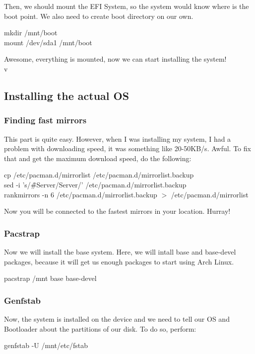 \documentclass{article}
\begin{document}
Then, we should mount the EFI System, so the system would know where is the boot point. We also need to create boot directory on our own.

\begin{center}
  mkdir /mnt/boot\\
  mount /dev/sda1 /mnt/boot\\
  \end{center}

Awesome, everything is mounted, now we can start installing the system!\\
v
\subsection{Installing the actual OS}

\subsubsection{Finding fast mirrors}

This part is quite easy. However, when I was installing my system, I had a problem with downloading speed, it was something like 20-50KB/s. Awful. To fix that and get the maximum download speed, do the following:

\begin{center}
  cp /etc/pacman.d/mirrorlist /etc/pacman.d/mirrorlist.backup\\
  sed -i 's/\^\#Server/Server/' /etc/pacman.d/mirrorlist.backup\\
  rankmirrors -n 6 /etc/pacman.d/mirrorlist.backup $>$ /etc/pacman.d/mirrorlist\\
  \end{center}

Now you will be connected to the fastest mirrors in your location. Hurray!\\

\subsubsection{Pacstrap}

Now we will install the base system. Here, we will intall base and base-devel packages, because
it will get us enough packages to start using Arch Linux.\\

\begin{center}
  pacstrap /mnt base base-devel\\
  \end{center}

\subsubsection{Genfstab}

Now, the system is installed on the device and we need to tell our OS and Bootloader about the partitions of our disk. To do so, perform:

\begin{center}
  genfstab -U /mnt/etc/fstab
  \end{center}
\end{document}
